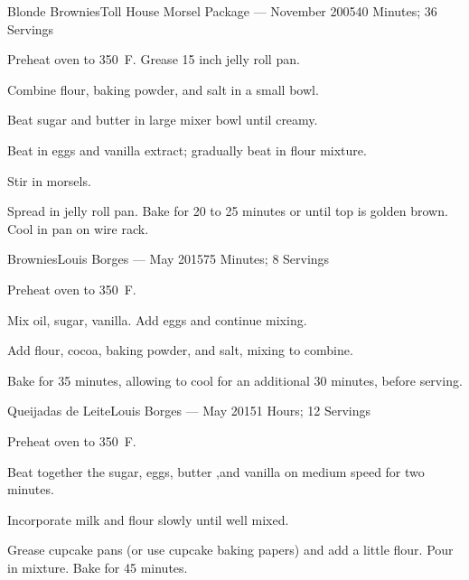 \documentclass{article}
\begin{document}
\begin{recipe}{Blonde Brownies}{Toll House Morsel Package --- November 2005}{40 Minutes; 36 Servings}

   \newstep
   Preheat oven to 350\ \0F. Grease 15 inch jelly roll pan.

   Combine flour, baking powder, and salt in a small bowl.

   Beat sugar and butter in large mixer bowl until creamy.

   Beat in eggs and vanilla extract; gradually beat in flour mixture.

   Stir in morsels.

   \newstep
   Spread in jelly roll pan.  Bake for 20 to 25 minutes or until top is golden brown.  Cool in pan on wire rack.

\end{recipe}

\begin{recipe}{Brownies}{Louis Borges --- May 2015}{75 Minutes; 8 Servings}

   \newstep
   Preheat oven to 350\ \0F.

   Mix oil, sugar, vanilla.  Add eggs and continue mixing.

   Add flour, cocoa, baking powder, and salt, mixing to combine.

   \newstep
   Bake for 35 minutes, allowing to cool for an additional 30 minutes, before
   serving.

\end{recipe}

\begin{recipe}{Queijadas de Leite}{Louis Borges --- May 2015}{1 Hours; 12 Servings}

   \newstep
   Preheat oven to 350\ \0F.

   Beat together the sugar, eggs, butter ,and vanilla on medium speed for two minutes.

   Incorporate milk and flour slowly until well mixed.

   \newstep
   Grease cupcake pans (or use cupcake baking papers) and add a little flour.
   Pour in mixture.  Bake for 45 minutes.

\end{recipe}
\end{document}
